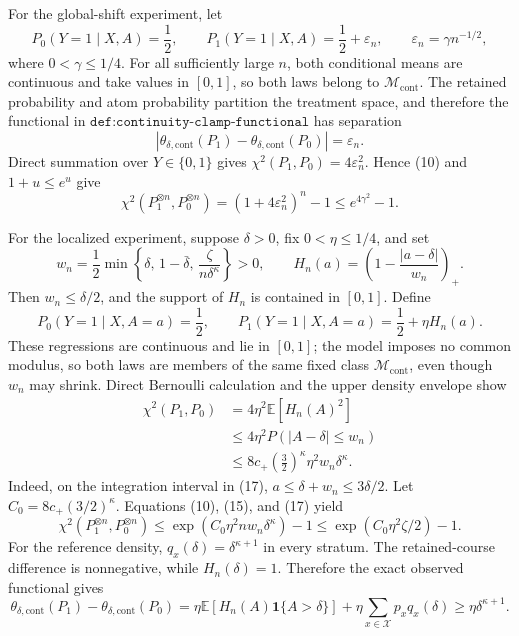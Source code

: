 For the global-shift experiment, let
\[
 P_0(Y=1\mid X,A)=\frac12,
 \qquad
 P_1(Y=1\mid X,A)=\frac12+\varepsilon_n,
 \qquad
 \varepsilon_n=\gamma n^{-1/2}, \tag{12}
\]
where \(0<\gamma\leq1/4\).  For all sufficiently large \(n\), both conditional means are continuous and take values in \([0,1]\), so both laws belong to \(\mathcal M_{\mathrm{cont}}\).  The retained probability and atom probability partition the treatment space, and therefore the functional in \(\texttt{def:continuity-clamp-functional}\) has separation
\[
 |\theta_{\delta,\mathrm{cont}}(P_1)-
   \theta_{\delta,\mathrm{cont}}(P_0)|=\varepsilon_n. \tag{13}
\]
Direct summation over \(Y\in\{0,1\}\) gives \(\chi^2(P_1,P_0)=4\varepsilon_n^2\).  Hence (10) and \(1+u\leq e^u\) give
\[
 \chi^2(P_1^{\otimes n},P_0^{\otimes n})
 =(1+4\varepsilon_n^2)^n-1
 \leq e^{4\gamma^2}-1. \tag{14}
\]

For the localized experiment, suppose \(\delta>0\), fix \(0<\eta\leq1/4\), and set
\[
 w_n=\frac12\min\left\{\delta,\,1-\bar\delta,\,
             \frac{\zeta}{n\delta^\kappa}\right\}>0,
 \qquad
 H_n(a)=\left(1-\frac{|a-\delta|}{w_n}\right)_+. \tag{15}
\]
Then \(w_n\leq\delta/2\), and the support of \(H_n\) is contained in \([0,1]\).  Define
\[
 P_0(Y=1\mid X,A=a)=\frac12,
 \qquad
 P_1(Y=1\mid X,A=a)=\frac12+\eta H_n(a). \tag{16}
\]
These regressions are continuous and lie in \([0,1]\); the model imposes no common modulus, so both laws are members of the same fixed class \(\mathcal M_{\mathrm{cont}}\), even though \(w_n\) may shrink.  Direct Bernoulli calculation and the upper density envelope show
\[
\begin{aligned}
 \chi^2(P_1,P_0)
 &=4\eta^2\mathbb E[H_n(A)^2]\\
 &\leq4\eta^2P(|A-\delta|\leq w_n)\\
 &\leq 8c_+\left(\frac32\right)^\kappa
       \eta^2w_n\delta^\kappa.
\end{aligned}\tag{17}
\]
Indeed, on the integration interval in (17), \(a\leq\delta+w_n\leq3\delta/2\).  Let \(C_0=8c_+(3/2)^\kappa\).  Equations (10), (15), and (17) yield
\[
 \chi^2(P_1^{\otimes n},P_0^{\otimes n})
 \leq\exp(C_0\eta^2nw_n\delta^\kappa)-1
 \leq\exp(C_0\eta^2\zeta/2)-1. \tag{18}
\]
For the reference density, \(q_x(\delta)=\delta^{\kappa+1}\) in every stratum.  The retained-course difference is nonnegative, while \(H_n(\delta)=1\).  Therefore the exact observed functional gives
\[
 \theta_{\delta,\mathrm{cont}}(P_1)-
 \theta_{\delta,\mathrm{cont}}(P_0)
 =\eta\mathbb E[H_n(A)\mathbf 1\{A>\delta\}]
   +\eta\sum_{x\in\mathcal X}p_xq_x(\delta)
 \geq\eta\delta^{\kappa+1}. \tag{19}
\]

